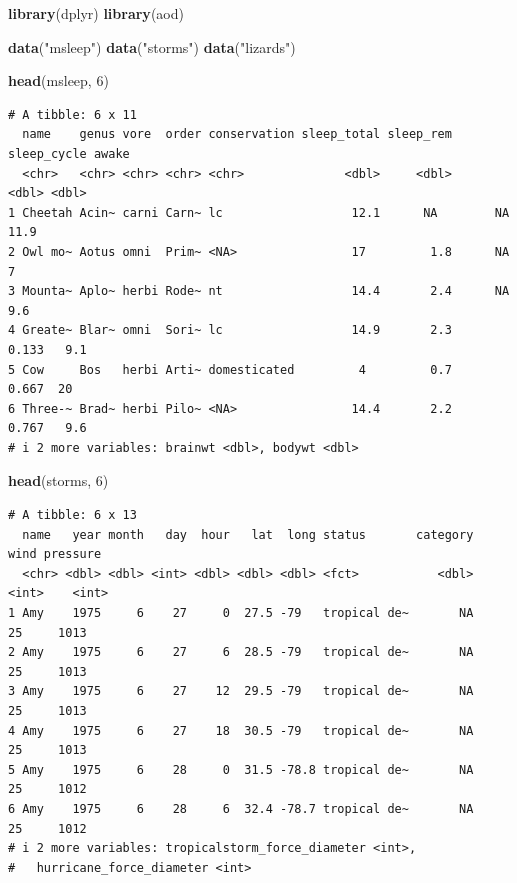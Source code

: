 \documentclass[
]{article}
\newenvironment{Shaded}{\begin{snugshade}}{\end{snugshade}}
\newcommand{\DecValTok}[1]{\textcolor[rgb]{0.00,0.00,0.81}{#1}}
\newcommand{\FunctionTok}[1]{\textcolor[rgb]{0.13,0.29,0.53}{\textbf{#1}}}
\newcommand{\NormalTok}[1]{#1}
\newcommand{\StringTok}[1]{\textcolor[rgb]{0.31,0.60,0.02}{#1}}
\begin{document}
\begin{Shaded}
\begin{Highlighting}[]
\FunctionTok{library}\NormalTok{(dplyr)}
\FunctionTok{library}\NormalTok{(aod)}

\FunctionTok{data}\NormalTok{(}\StringTok{"msleep"}\NormalTok{)}
\FunctionTok{data}\NormalTok{(}\StringTok{"storms"}\NormalTok{)}
\FunctionTok{data}\NormalTok{(}\StringTok{"lizards"}\NormalTok{)}

\FunctionTok{head}\NormalTok{(msleep, }\DecValTok{6}\NormalTok{)}
\end{Highlighting}
\end{Shaded}

\begin{verbatim}
# A tibble: 6 x 11
  name    genus vore  order conservation sleep_total sleep_rem sleep_cycle awake
  <chr>   <chr> <chr> <chr> <chr>              <dbl>     <dbl>       <dbl> <dbl>
1 Cheetah Acin~ carni Carn~ lc                  12.1      NA        NA      11.9
2 Owl mo~ Aotus omni  Prim~ <NA>                17         1.8      NA       7  
3 Mounta~ Aplo~ herbi Rode~ nt                  14.4       2.4      NA       9.6
4 Greate~ Blar~ omni  Sori~ lc                  14.9       2.3       0.133   9.1
5 Cow     Bos   herbi Arti~ domesticated         4         0.7       0.667  20  
6 Three-~ Brad~ herbi Pilo~ <NA>                14.4       2.2       0.767   9.6
# i 2 more variables: brainwt <dbl>, bodywt <dbl>
\end{verbatim}

\begin{Shaded}
\begin{Highlighting}[]
\FunctionTok{head}\NormalTok{(storms, }\DecValTok{6}\NormalTok{)}
\end{Highlighting}
\end{Shaded}

\begin{verbatim}
# A tibble: 6 x 13
  name   year month   day  hour   lat  long status       category  wind pressure
  <chr> <dbl> <dbl> <int> <dbl> <dbl> <dbl> <fct>           <dbl> <int>    <int>
1 Amy    1975     6    27     0  27.5 -79   tropical de~       NA    25     1013
2 Amy    1975     6    27     6  28.5 -79   tropical de~       NA    25     1013
3 Amy    1975     6    27    12  29.5 -79   tropical de~       NA    25     1013
4 Amy    1975     6    27    18  30.5 -79   tropical de~       NA    25     1013
5 Amy    1975     6    28     0  31.5 -78.8 tropical de~       NA    25     1012
6 Amy    1975     6    28     6  32.4 -78.7 tropical de~       NA    25     1012
# i 2 more variables: tropicalstorm_force_diameter <int>,
#   hurricane_force_diameter <int>
\end{verbatim}
\end{document}
